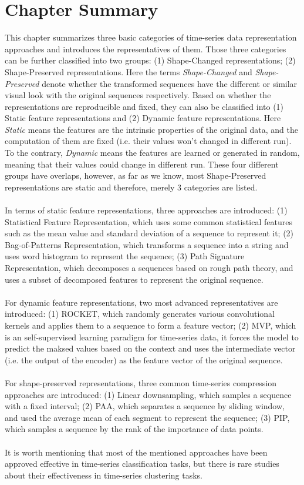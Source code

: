 \section{Chapter Summary}
This chapter summarizes three basic categories of time-series data representation approaches and introduces the representatives of them. Those three categories can be further classified into two groups: (1) Shape-Changed representations; (2) Shape-Preserved representations. Here the terms \emph{Shape-Changed} and \emph{Shape-Preserved} denote whether the transformed sequences have the different or similar visual look with the original sequences respectively. Based on whether the representations are reproducible and fixed, they can also be classified into (1) Static feature representations and (2) Dynamic feature representations. Here \emph{Static} means the features are the intrinsic properties of the original data, and the computation of them are fixed (i.e. their values won't changed in different run). To the contrary, \emph{Dynamic} means the features are learned or generated in random, meaning that their values could change in different run. These four different groups have overlaps, however, as far as we know, most Shape-Preserved representations are static and therefore, merely 3 categories are listed.\\
\\In terms of static feature representations, three approaches are introduced: (1) Statistical Feature Representation, which uses some common statistical features such as the mean value and standard deviation of a sequence to represent it; (2) Bag-of-Patterns Representation, which transforms a sequence into a string and uses word histogram to represent the sequence; (3) Path Signature Representation, which decomposes a sequences based on rough path theory, and uses a subset of decomposed features to represent the original sequence.\\
\\For dynamic feature representations, two most advanced representatives are introduced: (1) ROCKET, which randomly generates various convolutional kernels and applies them to a sequence to form a feature vector; (2) MVP, which is an self-supervised learning paradigm for time-series data, it forces the model to predict the maksed values based on the context and uses the intermediate vector (i.e. the output of the encoder) as the feature vector of the original sequence.\\
\\For shape-preserved representations, three common time-series compression approaches are introduced: (1) Linear downsampling, which samples a sequence with a fixed interval; (2) PAA, which separates a sequence by sliding window, and used the average mean of each segment to represent the sequence; (3) PIP, which samples a sequence by the rank of the importance of data points. \\
\\It is worth mentioning that most of the mentioned approaches have been approved effective in time-series classification tasks, but there is rare studies about their effectiveness in time-series clustering tasks.